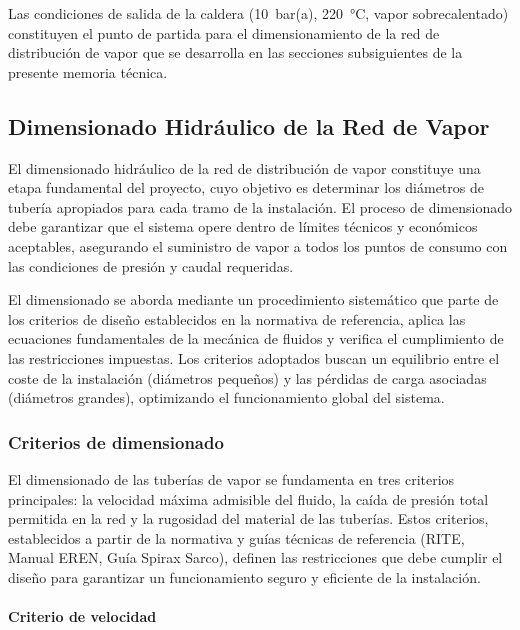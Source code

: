 \documentclass[12pt]{article}
\begin{document}
Las condiciones de salida de la caldera (10~bar(a), 220~°C, vapor sobrecalentado) constituyen el punto de partida para el dimensionamiento de la red de distribución de vapor que se desarrolla en las secciones subsiguientes de la presente memoria técnica.

\subsection{Dimensionado Hidráulico de la Red de Vapor}
\label{subsec:dimensionado-red-vapor}

El dimensionado hidráulico de la red de distribución de vapor constituye una etapa fundamental del proyecto, cuyo objetivo es determinar los diámetros de tubería apropiados para cada tramo de la instalación. El proceso de dimensionado debe garantizar que el sistema opere dentro de límites técnicos y económicos aceptables, asegurando el suministro de vapor a todos los puntos de consumo con las condiciones de presión y caudal requeridas.

El dimensionado se aborda mediante un procedimiento sistemático que parte de los criterios de diseño establecidos en la normativa de referencia, aplica las ecuaciones fundamentales de la mecánica de fluidos y verifica el cumplimiento de las restricciones impuestas. Los criterios adoptados buscan un equilibrio entre el coste de la instalación (diámetros pequeños) y las pérdidas de carga asociadas (diámetros grandes), optimizando el funcionamiento global del sistema.

\subsubsection{Criterios de dimensionado}
\label{subsubsec:criterios-dimensionado}

El dimensionado de las tuberías de vapor se fundamenta en tres criterios principales: la velocidad máxima admisible del fluido, la caída de presión total permitida en la red y la rugosidad del material de las tuberías. Estos criterios, establecidos a partir de la normativa y guías técnicas de referencia (RITE, Manual EREN, Guía Spirax Sarco), definen las restricciones que debe cumplir el diseño para garantizar un funcionamiento seguro y eficiente de la instalación.

\paragraph{Criterio de velocidad}
\end{document}
